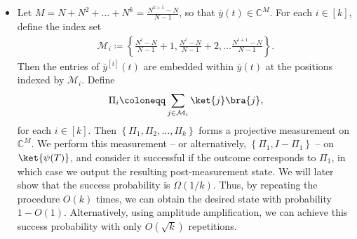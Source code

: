 \documentclass[superscriptaddress,onecolumn,nofootinbib,longbibliography,a4paper,accepted=2026-09-29]{quantumarticle}
\theoremstyle{plain}
\theoremstyle{definition}
\numberwithin{thm}{section}
\numberwithin{assumption}{section}
\numberwithin{lemma}{section}
\numberwithin{prop}{section}
\numberwithin{cor}{section}
\numberwithin{definition}{section}
\numberwithin{rmk}{section}
\numberwithin{equation}{section}
\newcommand{\myC}{\mathbb{C}}
\newcommand{\lrb}[1]{\left ( #1 \right )}
\newcommand{\lrcb}[1]{\left \{ #1 \right \}}
\newcommand{\defeq}{\coloneqq}
\newcommand{\myO}[1]{O\lrb{#1}}
\newcommand{\myOmega}[1]{\Omega\lrb{#1}}
\begin{document}
\begin{itemize}
\item 
Let $M=N+N^2+\dots+N^k=\frac{N^{k+1}-N}{N-1}$, so that $\bar{y}(t) \in \myC^M$. For each $i \in [k]$, define the index set 
\begin{align}
\mathcal{M}_i \defeq \lrcb{\frac{N^i-N}{N-1}+1, \frac{N^i-N}{N-1}+2, \dots
\frac{N^{i+1}-N}{N-1}}.   
\end{align}
Then the entries of $\bar{y}^{[i]}(t)$ are embedded within $\bar{y}(t)$ at the positions indexed by $\mathcal{M}_i$. Define
\begin{align}
\Pi_i \defeq \sum_{j \in \mathcal{M}_i} \ket{j}\bra{j},    
\end{align}
for each $i \in [k]$. Then $\lrcb{\Pi_1, \Pi_2, \dots, \Pi_k}$ forms a projective measurement on $\myC^M$. 
We perform this measurement -- or alternatively, $\lrcb{\Pi_1, I- \Pi_1}$ -- on $\ket{\psi(T)}$, and consider it successful if the  outcome corresponds to $\Pi_1$, in which case we output the resulting post-measurement state. We will later show that the success probability is $\myOmega{1/k}$. Thus, by repeating the  procedure $\myO{k}$ times, we can obtain the desired state with  probability $1-\myO{1}$. Alternatively, using amplitude amplification, we can achieve this success probability with only $\myO{\sqrt{k}}$ repetitions.
\end{itemize}
\end{document}
